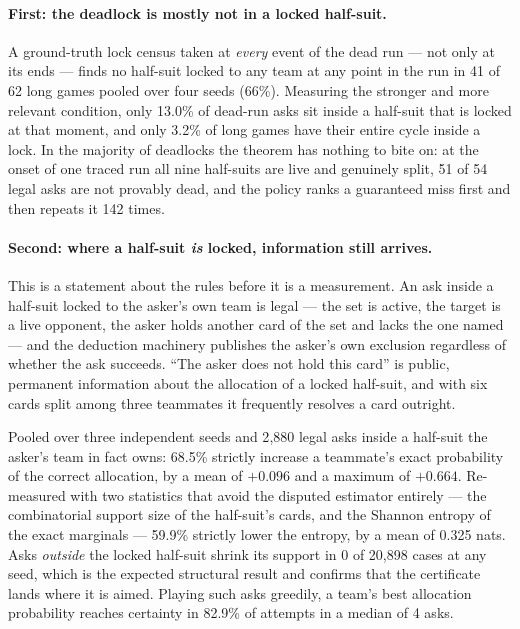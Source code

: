 \documentclass[11pt]{article}
\theoremstyle{definition}
\providecommand{\numNoLockPooled}{41}
\providecommand{\numNoLockPooledN}{62}
\providecommand{\numNoLockPct}{66}
\providecommand{\numRunAsksLocked}{13.0}
\providecommand{\numCycleInLock}{3.2}
\providecommand{\numCertN}{2{,}880}
\providecommand{\numCertRate}{68.5}
\providecommand{\numCertMean}{0.096}
\providecommand{\numCertMax}{0.664}
\providecommand{\numEntropyRate}{59.9}
\providecommand{\numEntropyMean}{0.325}
\providecommand{\numOutsideSupport}{20{,}898}
\providecommand{\numLadderRate}{82.9}
\providecommand{\numLadderMedian}{4}
\providecommand{\numTraceLive}{51}
\providecommand{\numTraceLegal}{54}
\providecommand{\numTraceRepeats}{142}
\begin{document}
\paragraph{First: the deadlock is mostly not in a locked half-suit.} A ground-truth
lock census taken at \emph{every} event of the dead run --- not only at its ends
--- finds no half-suit locked to any team at any point in the run in
\numNoLockPooled{} of \numNoLockPooledN{} long games pooled over four seeds
(\numNoLockPct\%). Measuring the stronger and more relevant condition, only
\numRunAsksLocked\% of dead-run asks sit inside a half-suit that is locked at that
moment, and only \numCycleInLock\% of long games have their entire cycle inside a
lock. In the majority of deadlocks the theorem has nothing to bite on: at the
onset of one traced run all nine half-suits are live and genuinely split,
\numTraceLive{} of \numTraceLegal{} legal asks are not provably dead, and the
policy ranks a guaranteed miss first and then repeats it \numTraceRepeats{}
times.

\paragraph{Second: where a half-suit \emph{is} locked, information still arrives.}
This is a statement about the rules before it is a measurement. An ask inside a
half-suit locked to the asker's own team is legal --- the set is active, the
target is a live opponent, the asker holds another card of the set and lacks the
one named --- and the deduction machinery publishes the asker's own exclusion
regardless of whether the ask succeeds. ``The asker does not hold this card'' is
public, permanent information about the allocation of a locked half-suit, and
with six cards split among three teammates it frequently resolves a card
outright.

Pooled over three independent seeds and \numCertN{} legal asks inside a
half-suit the asker's team in fact owns: \numCertRate\% strictly increase a
teammate's exact probability of the correct allocation, by a mean of
$+\numCertMean$ and a maximum of $+\numCertMax$. Re-measured with two statistics
that avoid the disputed estimator entirely --- the combinatorial support size of
the half-suit's cards, and the Shannon entropy of the exact marginals ---
\numEntropyRate\% strictly lower the entropy, by a mean of \numEntropyMean{}
nats. Asks \emph{outside} the locked half-suit shrink its support in
0 of \numOutsideSupport{} cases at any seed, which is the expected structural
result and confirms that the certificate lands where it is aimed. Playing such
asks greedily, a team's best allocation probability reaches certainty in
\numLadderRate\% of attempts in a median of \numLadderMedian{} asks.
\end{document}
